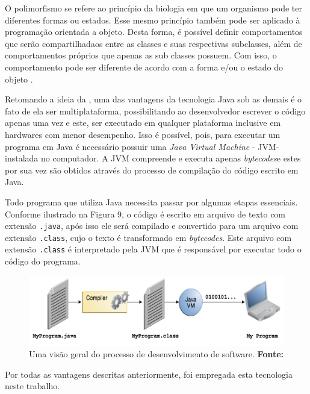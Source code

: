 O polimorfismo se refere ao princípio da biologia em que um organismo pode ter diferentes formas ou estados. Esse mesmo princípio também pode ser aplicado à programação orientada a objeto. Desta forma, é possível definir comportamentos que serão compartilhadaos entre as classes e suas respectivas subclasses, além de comportamentos próprios que apenas as sub classes possuem. Com isso, o comportamento pode ser diferente de acordo com a forma e/ou o estado do objeto \cite{polymorphism_oracle}.

\par Retomando a ideia da , uma das vantagens da tecnologia Java sob as demais é o fato de ela ser multiplataforma, possibilitando ao desenvolvedor escrever o código apenas uma vez e este, ser executado em qualquer plataforma inclusive em hardwares com menor desempenho. Isso é possível, pois, para executar um programa em Java é necessário possuir uma \textit{Java Virtual Machine} - JVM\footnotemark[13] - instalada no computador. A JVM compreende e executa apenas \textit{bytecodes}\footnotemark[14] e estes por sua vez são obtidos através do processo de compilação do código escrito em Java.



\par Todo programa que utiliza Java necessita passar por algumas etapas essenciais. Conforme ilustrado na Figura 9, o código é escrito em arquivo de texto com extensão \texttt{.java}, após isso ele será compilado e convertido para um arquivo com extensão \texttt{.class}, cujo o texto é transformado em \textit{bytecodes}. Este arquivo com extensão \texttt{.class} é interpretado pela JVM que é responsável por executar todo o código do programa.

\begin{figure}[h!]
	\centerline{\includegraphics[scale=1]{./imagens/processo_compilacao_java.png}}
	\caption[Uma visão geral do processo de desenvolvimento de software.]
	{Uma visão geral do processo de desenvolvimento de software. \textbf{Fonte:} }
	\label{fig:exemplo1}
\end{figure}

\par Por todas as vantagens descritas anteriormente, foi empregada esta tecnologia neste trabalho.
